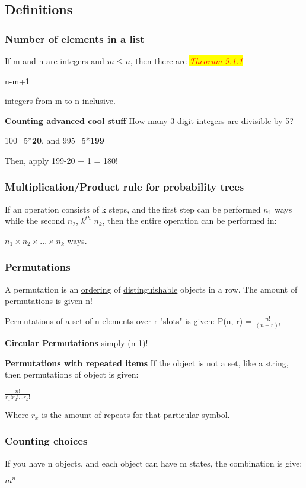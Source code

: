 \documentclass{article}
\newcommand{\theorum}[1]{\quad \quad \colorbox{yellow}{\textit{\textcolor{red}{Theorum #1}}}}
\newcommand{\sub}[1]{\vspace{10pt}\textbf{#1}}
\newcommand{\sbreak}{\vspace{10pt}}
\begin{document}
\subsection{Definitions}

\subsubsection{Number of elements in a list}
If m and n are integers and $m \leq n$, then there are \theorum{9.1.1}
\begin{center}
    n-m+1
\end{center}
integers from m to n inclusive.

\sub{Counting advanced cool stuff}
How many 3 digit integers are divisible by 5?

100=5*\textbf{20}, and 995=5*\textbf{199}

Then, apply 199-20 + 1 = 180!

\subsubsection{Multiplication/Product rule for probability trees}
If an operation consists of k steps, and the first step can be performed $n_1$ ways while the second $n_2$, $k^{th}$ $n_k$, then the entire operation can be performed in:
\begin{center}
    $n_1 \times n_2 \times ... \times n_k$ ways.
\end{center}

\subsubsection{Permutations}
A permutation is an \underline{ordering} of \underline{distinguishable} objects in a row. The amount of permutations is given n!

\sbreak

Permutations of a set of n elements over r "slots" is given: P(n, r) = $\frac{n!}{(n-r)!}$

\sub{Circular Permutations}
simply (n-1)!

\sub{Permutations with repeated items}
If the object is not a set, like a string, then permutations of object is given:
\begin{center}
    $\frac{n!}{r_1!r_2!...r_k!}$
\end{center}
Where $r_x$ is the amount of repeats for that particular symbol.

\subsubsection{Counting choices}
If you have n objects, and each object can have m states, the combination is give:
\begin{center}
    $m^n$
\end{center}
\end{document}
